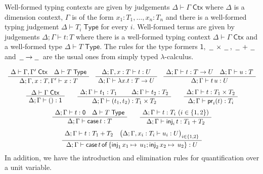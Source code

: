 \documentclass[a4paper,UKenglish]{lipics}
\newcommand{\ra}{\rightarrow}
\newcommand{\msf}[1]{\mathsf{#1}} %
\newcommand{\blank}{\, \underline{\hspace{2mm}} \,}
\newcommand{\unitTy}{\msf{1}}
\newcommand{\emptyTy}{\msf{0}}
\newcommand{\cj}[2]{#1 \vdash #2 \; \msf{ Ctx}}
\newcommand{\Tj}[2]{#1 \vdash #2 \; \msf{ Type}}
\newcommand{\tj}[4]{#1;#2 \vdash #3 : #4}
\newcommand{\proj}{\mathsf{pr}}
\newcommand{\inj}{\mathsf{inj}}
\newcommand{\emptyelim}{\mathsf{case}\,}
\newcommand{\case}[5]{\mathsf{case}\,#1\,\mathsf{of}\,\{\inj_1\,#2 \mapsto\,#3; \inj_2\,#4\mapsto\,#5\}}
\begin{document}
\vspace{3mm}  Well-formed typing contexts are given by judgements
$\cj\Delta\Gamma $ where $\Delta$ is a dimension context, $\Gamma$ is
of the form ${x_1 : T_1, \ldots, x_n:T_n}$ and there is a well-formed
typing judgement $\Tj\Delta{ T_i}$ for every $i$. Well-formed terms
are given by judgements $\tj \Delta \Gamma t T$ where there is a
well-formed typing context $\cj \Delta \Gamma$ and
a well-formed type $\Tj \Delta T $. The rules for
the type formers $\unitTy$, $\blank\times\blank$, $\blank+\blank$ and $\blank \! \ra \! \blank$ are the usual ones from
simply typed $\lambda$-calculus.

\[\begin{array}{c}%
\AxiomC{%
$\cj \Delta{\Gamma,\Gamma'}\quad
\Tj\Delta T$}
\UnaryInfC
{$\tj \Delta{\Gamma,x:T,\Gamma'}xT$}
\DisplayProof
\quad
\AxiomC{%
$
\tj\Delta {\Gamma,x:T} {t}{U}
$%
}
\UnaryInfC
{$\tj\Delta {\Gamma} {\lambda x.t}{T\to U}$}
\DisplayProof
\quad
\AxiomC{%
$
\tj\Delta {\Gamma} {t}{T\to U}\quad
\tj\Delta {\Gamma} {u}{T}
$%
}
\UnaryInfC
{$\tj \Delta{\Gamma}{t\,u}U$}
\DisplayProof
\\[5mm]
\AxiomC{%
$\cj\Delta {\Gamma}
$%
}
\UnaryInfC
{$\tj \Delta{\Gamma}{()}\unitTy$}
\DisplayProof
\qquad
\AxiomC{$\tj\Delta {\Gamma} {t_1}{T_1}$}
\AxiomC{$\tj\Delta {\Gamma} {t_2}{T_2}$}
\BinaryInfC
{$\tj \Delta{\Gamma}{(t_1,t_2)}{T_1\times T_2}$}
\DisplayProof
\qquad
\AxiomC{%
$
\tj\Delta {\Gamma} {t}{T_1\times T_2}
$%
}
\UnaryInfC
{$\tj\Delta {\Gamma} {\proj_i(t)}{T_i}$}
\DisplayProof
\\[5mm]
\AxiomC{%
$
\tj\Delta {\Gamma} {t}{\emptyTy}
\quad \Tj\Delta T$%
}
\UnaryInfC
{$\tj\Delta {\Gamma} {\emptyelim t}{T}$}
\DisplayProof
\qquad
\AxiomC{%
$
\tj\Delta {\Gamma} {t}{T_i}
\ (i\in\{1,2\})$}
\UnaryInfC
{$\tj\Delta {\Gamma} {\inj_i\,t}{T_1 + T_2}$}
\DisplayProof
\\[5mm]
\AxiomC{$\tj\Delta {\Gamma} {t}{T_1 + T_2}
\quad \big(\tj\Delta {\Gamma, x_i : T_i} {u_i}{U}\big)_{i\in\{1,2\}}$}
\UnaryInfC
{$\tj\Delta {\Gamma} {\case{t}{x_1}{u_1}{x_2}{u_2}}{U}$}
\DisplayProof
\end{array}\]
%
In addition, we have the introduction and elimination rules for quantification over a unit variable.
\end{document}
